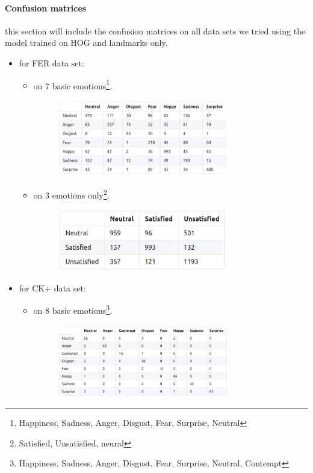 \paragraph{Confusion matrices}
this section will include the confusion matrices on all data sets we tried using the model trained on HOG and landmarks only.
\begin{itemize}
	\item for FER data set:
		\begin{itemize}
			\item on 7 basic emotions\footnote{Happiness, Sadness, Anger, Disgust, Fear, Surprise, Neutral}.
			\begin{figure}[H]
				\centering
				\includegraphics[width=0.75\textwidth]{images/fer_long.png}
			\end{figure}
		
			\item on 3 emotions only\footnote{Satisfied, Unsatisfied, neural}.
			\begin{figure}[H]
				\centering
				\includegraphics[width=0.75\textwidth]{images/fer_short.png}
			\end{figure}
		\end{itemize}
		
	\item for CK+ data set:
		\begin{itemize}
			\item on 8 basic emotions\footnote{Happiness, Sadness, Anger, Disgust, Fear, Surprise, Neutral, Contempt}.
			\begin{figure}[H]
				\centering
				\includegraphics[width=0.75\textwidth]{images/ck_long.png}
			\end{figure}
			

\end{itemize}
\end{itemize}
